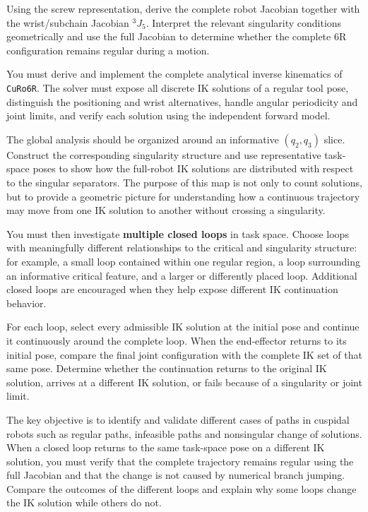 \documentclass[11pt,a4paper]{article}
\begin{document}
Using the screw representation, derive the complete robot Jacobian together with the wrist/subchain Jacobian $^{3}J_{5}$. Interpret the relevant singularity conditions geometrically and use the full Jacobian to determine whether the complete 6R configuration remains regular during a motion.

You must derive and implement the complete analytical inverse kinematics of \texttt{CuRo6R}. The solver must expose all discrete IK solutions of a regular tool pose, distinguish the positioning and wrist alternatives, handle angular periodicity and joint limits, and verify each solution using the independent forward model.

The global analysis should be organized around an informative $(q_2,q_3)$ slice. Construct the corresponding singularity structure and use representative task-space poses to show how the full-robot IK solutions are distributed with respect to the singular separators. The purpose of this map is not only to count solutions, but to provide a geometric picture for understanding how a continuous trajectory may move from one IK solution to another without crossing a singularity.

You must then investigate \textbf{multiple closed loops} in task space. Choose loops with meaningfully different relationships to the critical and singularity structure: for example, a small loop contained within one regular region, a loop surrounding an informative critical feature, and a larger or differently placed loop. Additional closed loops are encouraged when they help expose different IK continuation behavior.

For each loop, select every admissible IK solution at the initial pose and continue it continuously around the complete loop. When the end-effector returns to its initial pose, compare the final joint configuration with the complete IK set of that same pose. Determine whether the continuation returns to the original IK solution, arrives at a different IK solution, or fails because of a singularity or joint limit.

The key objective is to identify and validate different cases of paths in cuspidal robots such as regular paths, infeasible paths and nonsingular change of solutions. When a closed loop returns to the same task-space pose on a different IK solution, you must verify that the complete trajectory remains regular using the full Jacobian and that the change is not caused by numerical branch jumping. Compare the outcomes of the different loops and explain why some loops change the IK solution while others do not.
\end{document}
